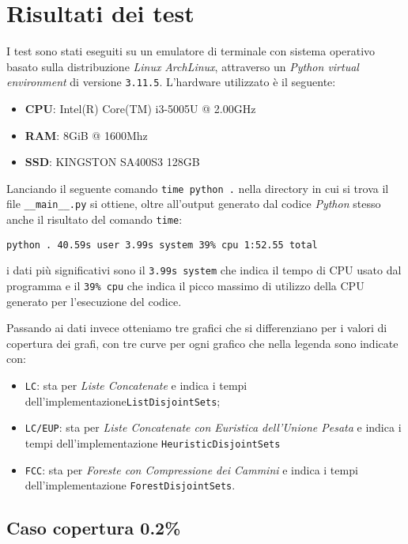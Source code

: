 \section{Risultati dei test}

I test sono stati eseguiti su un emulatore di terminale con sistema operativo basato sulla distribuzione \textit{Linux} \textit{ArchLinux},
attraverso un \textit{Python virtual environment} di versione \texttt{3.11.5}. L'hardware utilizzato è il seguente:
\begin{itemize}
    \item \textbf{CPU}: Intel(R) Core(TM) i3-5005U @ 2.00GHz
    \item \textbf{RAM}: 8GiB @ 1600Mhz
    \item \textbf{SSD}: KINGSTON SA400S3 128GB
\end{itemize}

Lanciando il seguente comando \texttt{time python .} nella directory in cui si trova il file \texttt{\_\_main\_\_.py} si ottiene,
oltre all'output generato dal codice \textit{Python} stesso anche il risultato del comando \texttt{time}:
\begin{center}
    \texttt{python .  40.59s user 3.99s system 39\% cpu 1:52.55 total}
\end{center}
i dati più significativi sono il \texttt{3.99s system} che indica il tempo di CPU usato dal programma e il \texttt{39\% cpu} che indica
il picco massimo di utilizzo della CPU generato per l'esecuzione del codice.\newline

Passando ai dati invece otteniamo tre grafici che si differenziano per i valori di copertura dei grafi, con tre curve
per ogni grafico che nella legenda sono indicate con:
\begin{itemize}
    \item \texttt{LC}: sta per \textit{Liste Concatenate} e indica i tempi dell'implementazione\linebreak \texttt{ListDisjointSets};
    \item \texttt{LC/EUP}: sta per \textit{Liste Concatenate con Euristica dell'Unione Pesata} e indica i tempi dell'implementazione
          \texttt{HeuristicDisjointSets}
    \item \texttt{FCC}: sta per \textit{Foreste con Compressione dei Cammini} e indica i tempi dell'implementazione \texttt{ForestDisjointSets}.
\end{itemize}

\subsection{Caso copertura 0.2\%}

